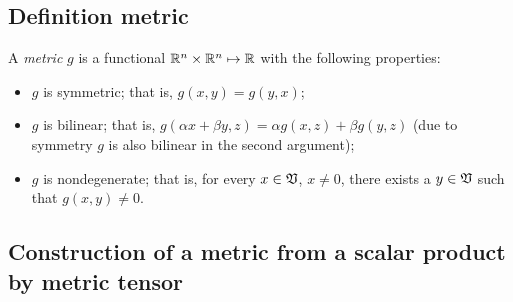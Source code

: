 \subsection{Definition metric}
\label{2011-m-metrict}

A {\em metric} $g$ is a functional ${\Bbb R}^n\times{\Bbb R}^n\mapsto {\Bbb R}$
with the following properties:
\begin{itemize}
\item
$g$ is symmetric; that is, $g(x,y)=g(y,x)$;
\item
$g$ is bilinear; that is,
$g(
\alpha x + \beta y, z)
= \alpha g( x,z) + \beta g(y, z)
$ (due to symmetry $g$ is also bilinear in the second argument);
\item
$g$ is nondegenerate; that is,
for every $x\in {\frak V}$, $x\neq 0$, there exists a
$y\in {\frak V}$ such that $g(x,y)\neq 0$.
\end{itemize}



\subsection{Construction of a metric from a scalar product by metric tensor}

